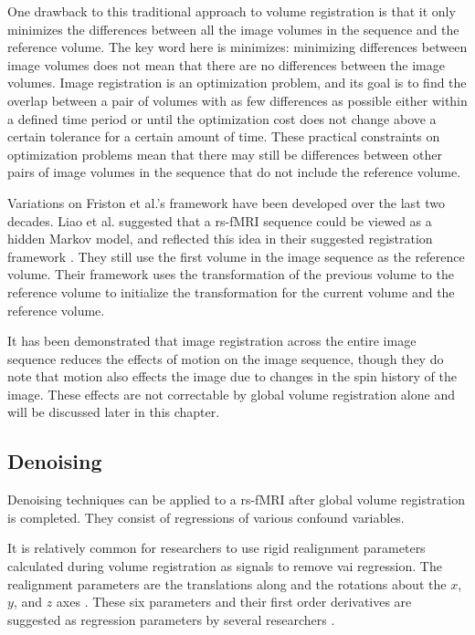 One drawback to this traditional approach to volume registration is that it only minimizes the differences between all the image volumes in the sequence and the reference volume. The key word here is minimizes: minimizing differences between image volumes does not mean that there are no differences between the image volumes. Image registration is an optimization problem, and its goal is to find the overlap between a pair of volumes with as few differences as possible either within a defined time period or until the optimization cost does not change above a certain tolerance for a certain amount of time. These practical constraints on optimization problems mean that there may still be differences between other pairs of image volumes in the sequence that do not include the reference volume. 

Variations on Friston et al.'s framework have been developed over the last two decades. Liao et al. suggested that a rs-fMRI sequence could be viewed as a hidden Markov model, and reflected this idea in their suggested registration framework \cite{Liao2016}. They still use the first volume in the image sequence as the reference volume. Their framework uses the transformation of the previous volume to the reference volume to initialize the transformation for the current volume and the reference volume. 

It has been demonstrated that image registration across the entire image sequence reduces the effects of motion on the image sequence, though they do note that motion also effects the image due to changes in the spin history of the image. These effects are not correctable by global volume registration alone and will be discussed later in this chapter.

\subsection{Denoising}

Denoising techniques can be applied to a rs-fMRI after global volume registration is completed. They consist of regressions of various confound variables. 

It is relatively common for researchers to use rigid realignment parameters calculated during volume registration as signals to remove vai regression. The realignment parameters are the translations along and the rotations about the $x$, $y$, and $z$ axes \cite{Power2012}. These six parameters and their first order derivatives are suggested as regression parameters by several researchers \cite{Power2012} \cite{Satterthwaite2012} \cite{VanDijk2012}. 


